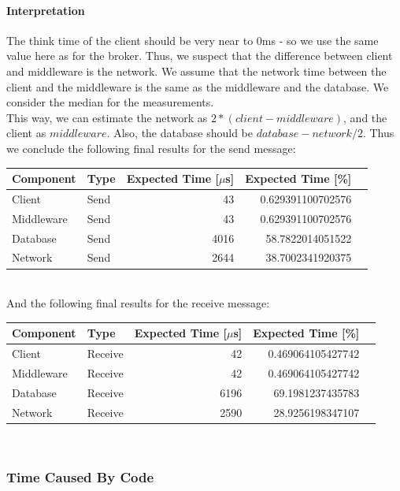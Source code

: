 \documentclass[milestone1.tex]{subfiles}
\begin{document}
\paragraph{Interpretation} The think time of the client should be very near to 0ms - so we use the same value here as for the broker. Thus, we suspect that the difference between client and middleware is the network. We assume that the network time between the client and the middleware is the same as the middleware and the database.  We consider the median for the measurements.\\
This way, we can estimate the network as $2*(client-middleware)$, and the client as $middleware$. Also, the database should be $database-network/2$.
Thus we conclude the following final results for the send message:\\

\begin{tabular}{|l|l|r|r|r|}
\hline
Component & Type & Expected Time [$\mu$s] & Expected Time [\%] \\ \hline
Client & Send & 43 & 0.629391100702576 \\ \hline
Middleware & Send & 43 & 0.629391100702576 \\ \hline
Database & Send & 4016 & 58.7822014051522 \\ \hline
Network & Send & 2644 & 38.7002341920375 \\ \hline
\end{tabular}
\\

\noindent And the following final results for the receive message:\\

\begin{tabular}{|l|l|r|r|r|}
\hline
Component & Type & Expected Time [$\mu$s] & Expected Time [\%] \\ \hline
Client & Receive & 42 & 0.469064105427742 \\ \hline
Middleware & Receive & 42 & 0.469064105427742 \\ \hline
Database & Receive & 6196 & 69.1981237435783 \\ \hline
Network & Receive & 2590 & 28.9256198347107 \\ \hline
\end{tabular}
\\



\subsubsection{Time Caused By Code}
\end{document}
